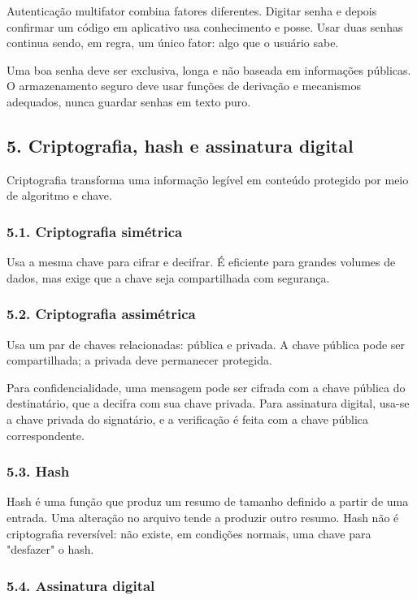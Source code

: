 \documentclass[11pt,a4paper]{article}
\begin{document}
Autenticação multifator combina fatores diferentes. Digitar senha e depois confirmar um código em aplicativo usa conhecimento e posse. Usar duas senhas continua sendo, em regra, um único fator: algo que o usuário sabe.

Uma boa senha deve ser exclusiva, longa e não baseada em informações públicas. O armazenamento seguro deve usar funções de derivação e mecanismos adequados, nunca guardar senhas em texto puro.

\subsection*{5. Criptografia, hash e assinatura digital}

Criptografia transforma uma informação legível em conteúdo protegido por meio de algoritmo e chave.

\subsubsection*{5.1. Criptografia simétrica}

Usa a mesma chave para cifrar e decifrar. É eficiente para grandes volumes de dados, mas exige que a chave seja compartilhada com segurança.

\subsubsection*{5.2. Criptografia assimétrica}

Usa um par de chaves relacionadas: pública e privada. A chave pública pode ser compartilhada; a privada deve permanecer protegida.

Para confidencialidade, uma mensagem pode ser cifrada com a chave pública do destinatário, que a decifra com sua chave privada. Para assinatura digital, usa-se a chave privada do signatário, e a verificação é feita com a chave pública correspondente.

\subsubsection*{5.3. Hash}

Hash é uma função que produz um resumo de tamanho definido a partir de uma entrada. Uma alteração no arquivo tende a produzir outro resumo. Hash não é criptografia reversível: não existe, em condições normais, uma chave para "desfazer" o hash.

\subsubsection*{5.4. Assinatura digital}
\end{document}
